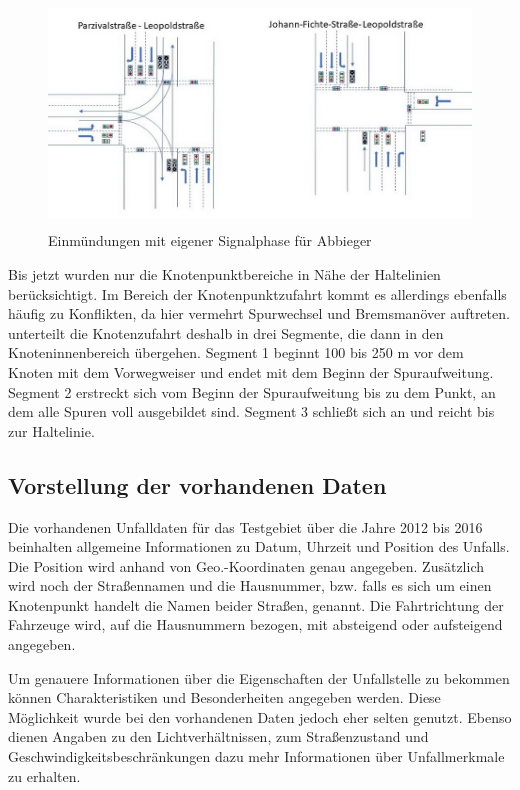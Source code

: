 \begin{savenotes}
	\begin{figure}[H]
		\centering
		\includegraphics[width=12cm,height=6cm]{figures/Einmuendungen_eigene_Phase}
		\caption[Einmündungen mit eigener Signaphase für Abbieger]{Einmündungen mit eigener Signalphase für Abbieger \parencite{Kutsch.05.04.2018}}\label{fig:Einmüngungen_eigene_Phase}
	\end{figure}
\end{savenotes}

Bis jetzt wurden nur die Knotenpunktbereiche in Nähe der Haltelinien berücksichtigt. Im Bereich der Knotenpunktzufahrt kommt es allerdings ebenfalls häufig zu Konflikten, da hier vermehrt Spurwechsel und Bremsmanöver auftreten. \Textcite[S. 19]{Erke.1978} unterteilt die Knotenzufahrt deshalb in drei Segmente, die dann in den Knoteninnenbereich übergehen. Segment 1 beginnt 100 bis 250 m vor dem Knoten mit dem Vorwegweiser und endet mit dem Beginn der Spuraufweitung. Segment 2 erstreckt sich vom Beginn der Spuraufweitung bis zu dem Punkt, an dem alle Spuren voll ausgebildet sind. Segment 3 schließt sich an und reicht bis zur Haltelinie.

\subsection{Vorstellung der vorhandenen Daten}
Die vorhandenen Unfalldaten für das Testgebiet über die Jahre 2012 bis 2016 beinhalten allgemeine Informationen zu Datum, Uhrzeit und Position des Unfalls. Die Position wird anhand von Geo.-Koordinaten genau angegeben. Zusätzlich wird noch der Straßennamen und die Hausnummer, bzw. falls es sich um einen Knotenpunkt handelt die Namen beider Straßen, genannt. Die Fahrtrichtung der Fahrzeuge wird, auf die Hausnummern bezogen, mit absteigend oder aufsteigend angegeben.

Um genauere Informationen über die Eigenschaften der Unfallstelle zu bekommen können Charakteristiken und Besonderheiten angegeben werden. Diese Möglichkeit wurde bei den vorhandenen Daten jedoch eher selten genutzt. Ebenso dienen Angaben zu den Lichtverhältnissen, zum Straßenzustand und Geschwindigkeitsbeschränkungen dazu mehr Informationen über Unfallmerkmale zu erhalten.


